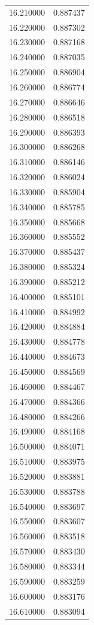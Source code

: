 \begin{tabular}{rr}
16.210000 & 0.887437 \\
16.220000 & 0.887302 \\
16.230000 & 0.887168 \\
16.240000 & 0.887035 \\
16.250000 & 0.886904 \\
16.260000 & 0.886774 \\
16.270000 & 0.886646 \\
16.280000 & 0.886518 \\
16.290000 & 0.886393 \\
16.300000 & 0.886268 \\
16.310000 & 0.886146 \\
16.320000 & 0.886024 \\
16.330000 & 0.885904 \\
16.340000 & 0.885785 \\
16.350000 & 0.885668 \\
16.360000 & 0.885552 \\
16.370000 & 0.885437 \\
16.380000 & 0.885324 \\
16.390000 & 0.885212 \\
16.400000 & 0.885101 \\
16.410000 & 0.884992 \\
16.420000 & 0.884884 \\
16.430000 & 0.884778 \\
16.440000 & 0.884673 \\
16.450000 & 0.884569 \\
16.460000 & 0.884467 \\
16.470000 & 0.884366 \\
16.480000 & 0.884266 \\
16.490000 & 0.884168 \\
16.500000 & 0.884071 \\
16.510000 & 0.883975 \\
16.520000 & 0.883881 \\
16.530000 & 0.883788 \\
16.540000 & 0.883697 \\
16.550000 & 0.883607 \\
16.560000 & 0.883518 \\
16.570000 & 0.883430 \\
16.580000 & 0.883344 \\
16.590000 & 0.883259 \\
16.600000 & 0.883176 \\
16.610000 & 0.883094 \\

\end{tabular}
